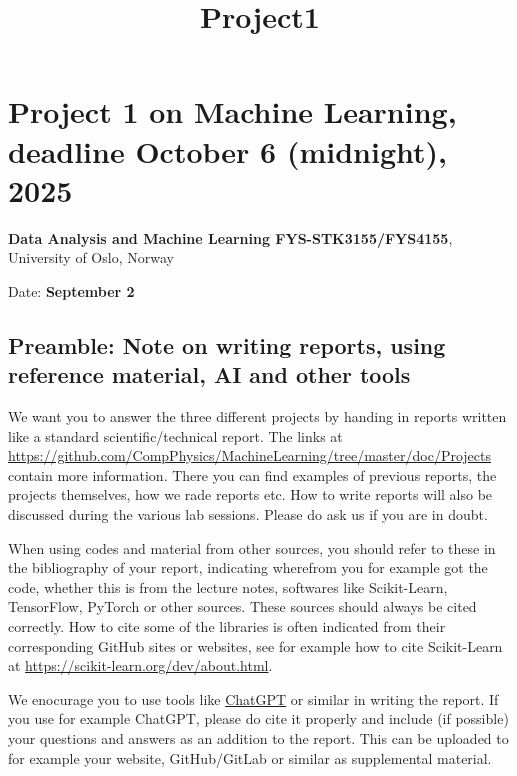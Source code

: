 \documentclass[11pt]{article}
\title{Project1}
\begin{document}
    
    \maketitle
    
    

    
    

    \hypertarget{project-1-on-machine-learning-deadline-october-6-midnight-2025}{%
\section*{Project 1 on Machine Learning, deadline October 6 (midnight),
2025}\label{project-1-on-machine-learning-deadline-october-6-midnight-2025}}

\textbf{Data Analysis and Machine Learning FYS-STK3155/FYS4155},
University of Oslo, Norway

Date: \textbf{September 2}

    \hypertarget{preamble-note-on-writing-reports-using-reference-material-ai-and-other-tools}{%
\subsection*{Preamble: Note on writing reports, using reference material,
AI and other
tools}\label{preamble-note-on-writing-reports-using-reference-material-ai-and-other-tools}}

We want you to answer the three different projects by handing in reports
written like a standard scientific/technical report. The links at
\url{https://github.com/CompPhysics/MachineLearning/tree/master/doc/Projects}
contain more information. There you can find examples of previous
reports, the projects themselves, how we rade reports etc. How to write
reports will also be discussed during the various lab sessions. Please
do ask us if you are in doubt.

When using codes and material from other sources, you should refer to
these in the bibliography of your report, indicating wherefrom you for
example got the code, whether this is from the lecture notes, softwares
like Scikit-Learn, TensorFlow, PyTorch or other sources. These sources
should always be cited correctly. How to cite some of the libraries is
often indicated from their corresponding GitHub sites or websites, see
for example how to cite Scikit-Learn at
\url{https://scikit-learn.org/dev/about.html}.

We enocurage you to use tools like
\href{https://openai.com/chatgpt/}{ChatGPT} or similar in writing the
report. If you use for example ChatGPT, please do cite it properly and
include (if possible) your questions and answers as an addition to the
report. This can be uploaded to for example your website, GitHub/GitLab
or similar as supplemental material.
\end{document}
